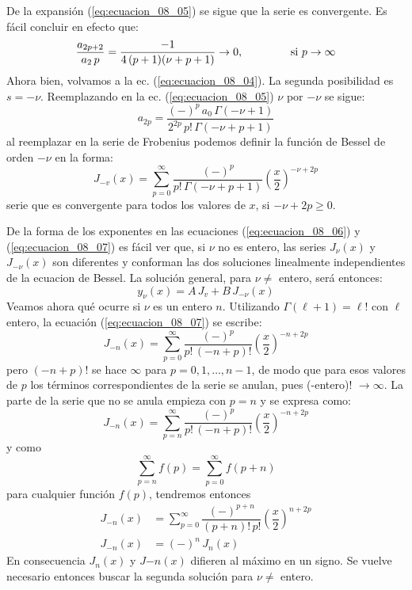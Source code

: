 De la expansión (\ref{eq:ecuacion_08_05}) se sigue que la serie es convergente. Es fácil concluir en efecto que:
\[ \dfrac{a_{2p+2}}{a_{2} \, p} = \dfrac{-1}{4 \, (p+1)(\nu + p + 1)} \to 0,\hspace{1.5cm} \mbox{si } p \to \infty \]
Ahora bien, volvamos a la ec. (\ref{eq:ecuacion_08_04}). La segunda posibilidad es $s = -\nu$. Reemplazando en la ec. (\ref{eq:ecuacion_08_05}) $\nu$ por $-\nu$ se sigue:
\[ a_{2p} = \dfrac{(-)^{p} \, a_{0} \, \Gamma (-\nu + 1)}{2^{2p} \, p! \, \Gamma (-\nu + p + 1)} \]
al reemplazar en la serie de Frobenius podemos definir la función de Bessel de orden $-\nu$ en la forma:
\begin{equation}
\boxed{J_{-v} (x) = \sum_{p=0}^{\infty} \dfrac{(-)^{p}}{p! \, \Gamma (-\nu + p + 1)} \left( \dfrac{x}{2} \right)^{-\nu+2p}}
\label{eq:ecuacion_08_07}
\end{equation}
serie que es convergente para todos los valores de $x$, si $-\nu + 2p \geq 0$.
\par
De la forma de los exponentes en las ecuaciones (\ref{eq:ecuacion_08_06}) y (\ref{eq:ecuacion_08_07}) es fácil ver que, si $\nu$ no es entero, las series $J_{\nu}(x)$ y $J_{-\nu}(x)$ son diferentes y conforman las dos soluciones linealmente independientes de la ecuacion de Bessel. La solución general, para $\nu \neq$ entero, será entonces:
\[ y_{\nu}(x) = A \, J_{v} + B \, J_{-\nu} (x) \]
Veamos ahora qué ocurre si $\nu$ es un entero $n$. Utilizando $\Gamma (\ell + 1) = \ell !$ con $\ell$ entero, la ecuación (\ref{eq:ecuacion_08_07}) se escribe:
\[ J_{-n} (x) = \sum_{p=0}^{\infty} \dfrac{(-)^{p}}{p! \, (-n + p)!} \left( \dfrac{x}{2} \right)^{-n+2p} \]
pero $(-n + p)!$ se hace $\infty$ para $p = 0, 1, \ldots, n-1$, de modo que para esos valores de $p$ los términos correspondientes de la serie se anulan, pues (-entero)! $\to \infty$. La parte de la serie que no se anula empieza con $p = n$ y se expresa como:
\[ J_{-n} (x) = \sum_{p=n}^{\infty} \dfrac{(-)^{p}}{p! \, (-n + p)!} \left( \dfrac{x}{2} \right)^{-n+2p} \]
y como 
\[ \sum_{p=n}^{\infty} f(p) = \sum_{p=0}^{\infty} f(p + n) \]
para cualquier función $f(p)$, tendremos entonces
\begin{align*}
J_{-n} (x) &= \sum_{p=0}^{\infty} \dfrac{(-)^{p+n}}{(p + n)! \, p!} \left( \dfrac{x}{2} \right)^{n+2p} \\
J_{-n} (x) &= (-)^{n} \, J_{n}(x)
\end{align*}
En consecuencia $J_{n}(x)$ y $J{-n}(x)$ difieren al máximo en un signo. Se vuelve necesario entonces buscar la segunda solución para $\nu \neq$ entero.
